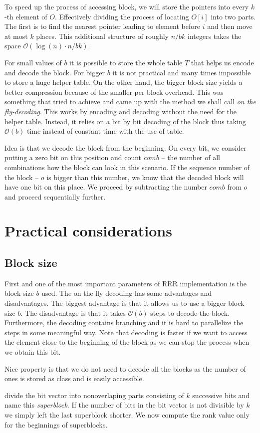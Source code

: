 To speed up the process of accessing block, we will store the pointers into every
$k$-th element of $O$. Effectively dividing the process of locating $O[i]$ into two
parts. The first is to find the nearest pointer leading to element before $i$ and
then move at most $k$ places. This additional structure of roughly $n/bk$ integers
takes the space $\mathcal{O}(\log(n)\cdot n/bk)$.

For small values of $b$ it is possible to store the whole table $T$ that helps us
encode and decode the block. For bigger $b$ it is not practical and many times
impossible to store a huge helper table. On the other hand, the bigger block size
yields a better compression because of the smaller per block overhead. This was
something that \cite{navarro2012fast} tried to achieve and came up with the method
we shall call \textit{on the fly-decoding}. This works by encoding and decoding without
the need for the helper table. Instead, it relies on a bit by bit decoding of the block
thus taking $\mathcal{O}(b)$ time instead of constant time with the use of table.

Idea is that we decode the block from the beginning. On every bit, we consider putting a
zero bit on this position and count $comb$ -- the number of all combinations how the block can
look in this scenario. If the sequence number of the block -- $o$ is bigger than this number,
we know that the decoded block will have one bit on this place. We proceed by subtracting the
number $comb$ from $o$ and proceed sequentially further.

\section{Practical considerations}

\subsection{Block size}

First and one of the most important parameters of RRR implementation is the block
size $b$ used. The on the fly decoding has some advantages and disadvantages. The
biggest advantage is that it allows us to use a bigger block size $b$. The disadvantage
is that it takes $\mathcal{O}(b)$ steps to decode the block. Furthermore, the decoding
contains branching and it is hard to parallelize the steps in some meaningful way.
Note that decoding is faster if we want to access the element close to the beginning of
the block as we can stop the process when we obtain this bit.


Nice property is that we do not need to decode all the blocks as the number of ones
is stored as class and is easily accessible.

divide the bit vector into nonoverlaping parts consisting of $k$
successive bits and name this \textit{superblock}. If the number of bits in the bit vector
is not divisible by $k$ we simply left the last superblock shorter. We now compute the rank
value only for the beginnings of superblocks.